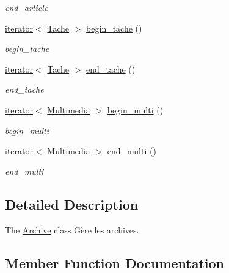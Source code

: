 \begin{DoxyCompactItemize}
\begin{DoxyCompactList}\small\item\em end\+\_\+article \end{DoxyCompactList}\item 
\hyperlink{class_archive_1_1iterator}{iterator}$<$ \hyperlink{class_tache}{Tache} $>$ \hyperlink{class_archive_aaca2e89ecc8bb65a69640091e64ab5b1}{begin\+\_\+tache} ()
\begin{DoxyCompactList}\small\item\em begin\+\_\+tache \end{DoxyCompactList}\item 
\hyperlink{class_archive_1_1iterator}{iterator}$<$ \hyperlink{class_tache}{Tache} $>$ \hyperlink{class_archive_a6748a002b28fb253f1e8216e088e63c5}{end\+\_\+tache} ()
\begin{DoxyCompactList}\small\item\em end\+\_\+tache \end{DoxyCompactList}\item 
\hyperlink{class_archive_1_1iterator}{iterator}$<$ \hyperlink{class_multimedia}{Multimedia} $>$ \hyperlink{class_archive_a6f0ba14787013c3a0dd35131f5e45222}{begin\+\_\+multi} ()
\begin{DoxyCompactList}\small\item\em begin\+\_\+multi \end{DoxyCompactList}\item 
\hyperlink{class_archive_1_1iterator}{iterator}$<$ \hyperlink{class_multimedia}{Multimedia} $>$ \hyperlink{class_archive_a0bf5d8c15ce9a7494f9e3e66711b76e5}{end\+\_\+multi} ()
\begin{DoxyCompactList}\small\item\em end\+\_\+multi \end{DoxyCompactList}\end{DoxyCompactItemize}


\subsection{Detailed Description}
The \hyperlink{class_archive}{Archive} class Gère les archives. 

\subsection{Member Function Documentation}
\mbox{\label{class_archive_a5f62010e4c8dc87cf56c5cda92be2c94}} 
